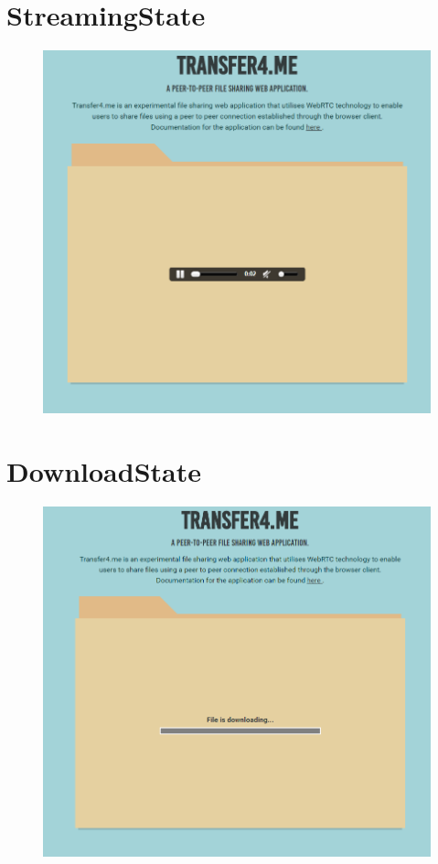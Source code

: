 \documentclass[]{report}
\begin{document}
	\section{StreamingState}
		\begin{figure}[H]
			\centering
			\includegraphics[scale=0.6]{streamingstate.png}
		\end{figure}	
	\section{DownloadState}
		\begin{figure}[H]
			\centering
			\includegraphics[scale=0.6]{downloadstate.png}
		\end{figure}
\end{document}
